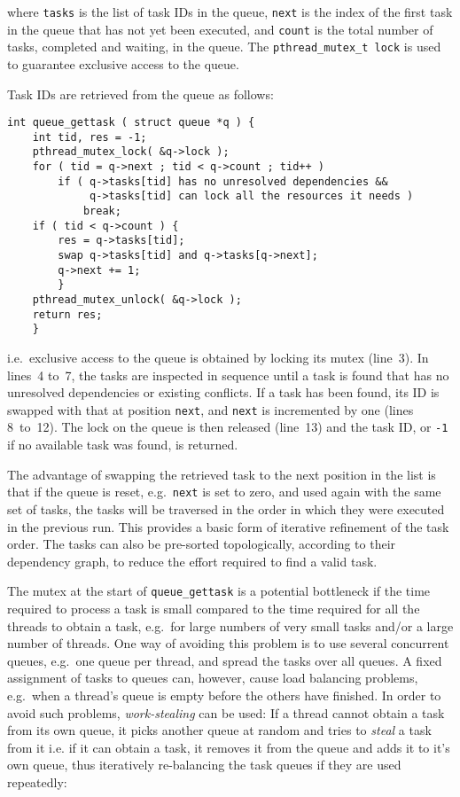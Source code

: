 \documentclass[final]{siamltex}
\begin{document}
\noindent where {\tt tasks} is the list of task IDs in the queue, {\tt next}
is the index of the first task in the queue that has not yet been executed,
and {\tt count} is the total number of tasks, completed and waiting,
in the queue.
The {\tt pthread\_mutex\_t lock} is used to guarantee exclusive access
to the queue.

Task IDs are retrieved from the queue as follows:        

\begin{center}\begin{minipage}{0.8\textwidth}
    \begin{lstlisting}
int queue_gettask ( struct queue *q ) {
    int tid, res = -1;
    pthread_mutex_lock( &q->lock );
    for ( tid = q->next ; tid < q->count ; tid++ )
        if ( q->tasks[tid] has no unresolved dependencies &&
             q->tasks[tid] can lock all the resources it needs )
            break;
    if ( tid < q->count ) {
        res = q->tasks[tid];
        swap q->tasks[tid] and q->tasks[q->next];
        q->next += 1;
        }
    pthread_mutex_unlock( &q->lock );
    return res;
    }
    \end{lstlisting}
\end{minipage}\end{center}

\noindent i.e.~exclusive access to the queue is obtained by locking
its mutex (line~3). In lines~4 to~7, the tasks are inspected
in sequence until a task is found that has no unresolved
dependencies or existing conflicts.
If a task has been found, its ID is swapped with that at
position {\tt next}, and {\tt next} is incremented by one
(lines 8~to~12).
The lock on the queue is then released (line~13) and
the task ID, or {\tt -1} if no available task was found, is
returned.

The advantage of swapping the retrieved task to the next
position in the list is that if the queue is reset, e.g.~{\tt next}
is set to zero, and used again with the same set of tasks,
the tasks will be traversed in the order in which they were
executed in the previous run.
This provides a basic form of iterative refinement of the task
order.
The tasks can also be pre-sorted topologically, according to their
dependency graph, to reduce the effort required to find
a valid task.

The mutex at the start of {\tt queue\_gettask} is a potential
bottleneck if the time required to process a task is small
compared to the time required for all the threads to obtain
a task, e.g.~for large numbers of very small tasks and/or
a large number of threads.
One way of avoiding this problem is to use several concurrent
queues, e.g.~one queue per thread, and spread the tasks over
all queues.
A fixed assignment of tasks to queues can, however,
cause load balancing problems, e.g.~when a thread's queue is
empty before the others have finished.
In order to avoid such problems, {\em work-stealing} can be used:
If a thread cannot obtain a task from its own queue, it picks
another queue at random and tries to {\em steal} a task from it
i.e. if it can obtain a task, it removes it from the queue and
adds it to it's own queue, thus iteratively re-balancing
the task queues if they are used repeatedly:
\end{document}
